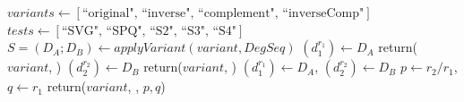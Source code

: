 \documentclass[11pt]{article}
\begin{document}
 

\begin{algorithm}[H]
\caption{{\tt DetermineSplitType}($\mathit{DegSeq}$)}
\begin{algorithmic}[1]
	\STATE $\mathit{variants} \leftarrow [\text{``original", ``inverse", ``complement", ``inverseComp"}]$
     	\STATE $\mathit{tests} \leftarrow [\text{``SVG", ``SPQ", ``S2", ``S3", ``S4"}]$
      		\STATE $S = (D_A; D_B) \leftarrow {applyVariant}(variant, \mathit{DegSeq})$\;
                  			\STATE $(d_1^{r_1}) \leftarrow D_A$\;
                    				\STATE return($variant$,  )
                  			\ENDIF
			           \ENDIF
                  			\STATE $(d_2^{r_2}) \leftarrow D_B$\;
                    			     \STATE return($variant$,  )
	             			\ENDIF
			           \ENDIF
			     \ENDIF   	
	                	     	\STATE $(d_1^{r_1}) \leftarrow D_A$, $(d_2^{r_2}) \leftarrow D_B$
		               			\STATE $p \leftarrow r_2 / r_1$, $q \leftarrow r_1$
							     \STATE return($variant$, , $p, q$)
							 \ENDIF
				          \ENDIF
		             \ENDIF    
		             

\end{algorithmic}
\end{algorithm}
\end{document}
